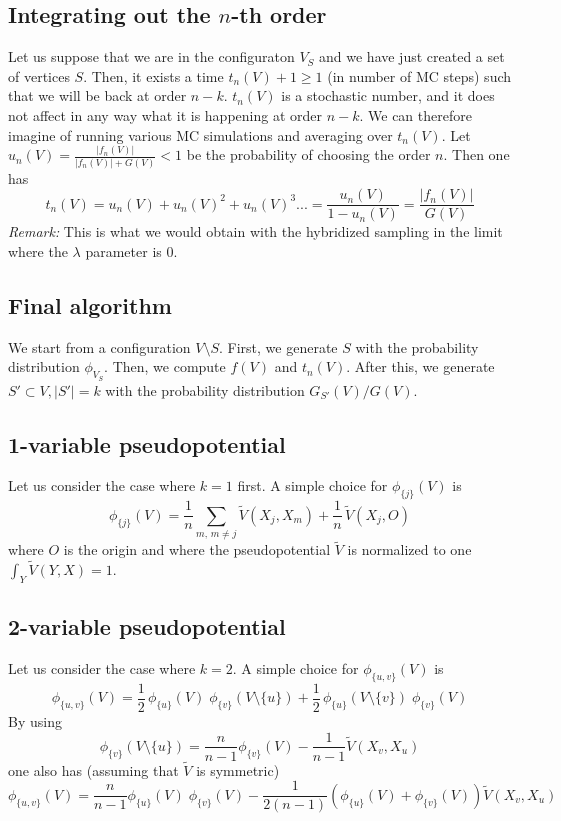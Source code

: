 \documentclass{article}
\begin{document}
\subsection{Integrating out the $n$-th order}
Let us suppose that we are in the configuraton $V_S$ and we have just created a set of vertices $S$. Then, it exists a time $t_n(V)+1\ge 1$ (in number of MC steps) such that we will be back at order $n-k$.  $t_n(V)$ is a stochastic number, and it does not affect in any way what it is happening at order $n-k$. We can therefore imagine of running various MC simulations and averaging over $t_n(V)$. Let $u_n(V) =\frac{|f_n(V)|}{|f_n(V)|+ G(V)}<1$ be the probability of choosing the order $n$. Then one has
$$
t_n(V) = u_n(V)+u_n(V)^2+u_n(V)^3...= \frac{u_n(V)}{1-u_n(V)}= \frac{|f_n(V)|}{G(V)}
$$
{\it Remark:} This is what we would obtain with the hybridized sampling in the limit where the $\lambda$ parameter is 0.

\subsection{Final algorithm}
We start from a configuration $V\setminus S$. First, we generate $S$ with the probability distribution $\phi_{V_S}$. Then, we compute $f(V)$ and $t_n(V)$. After this, we generate $S'\subset V, |S'|=k$ with the probability distribution $G_{S'}(V)/G(V)$.

\subsection{1-variable pseudopotential}
Let us consider the case where $k=1$ first.
A simple choice for $\phi_{\{j\}}(V)$ is
$$
\phi_{\{j\}}(V) = \frac{1}{n}\sum_{m,\,m\neq j} \tilde{V}(X_j,X_m)+\frac{1}{n}\,\tilde{V}(X_j, O)
$$
where $O$ is the origin and where the pseudopotential $\tilde{V}$ is normalized to one $\int_Y \tilde{V}(Y,X) = 1$. 
\subsection{2-variable pseudopotential}
Let us consider the case where $k=2$.
A simple choice for $\phi_{\{u,v\}}(V)$ is
$$
\phi_{\{u,v\}}(V) = \frac{1}{2}\,\phi_{\{u\}}(V)\;\phi_{\{v\}}(V\setminus\{u\})+\frac{1}{2}\,\phi_{\{u\}}(V\setminus\{v\})\;\phi_{\{v\}}(V)
$$
By using
$$
\phi_{\{v\}}(V\setminus\{u\})= \frac{n}{n-1}\phi_{\{v\}}(V)-\frac{1}{n-1}\tilde{V}(X_v,X_u)
$$
one also has (assuming that $\tilde{V}$ is symmetric)
$$
\phi_{\{u,v\}}(V) = \frac{n}{n-1}\phi_{\{u\}}(V)\;\phi_{\{v\}}(V)-\frac{1}{2(n-1)}\left(\phi_{\{u\}}(V)+\phi_{\{v\}}(V)\right)\tilde{V}(X_v,X_u)
$$
\end{document}
